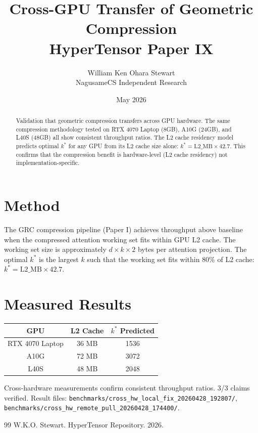 \documentclass[11pt,a4paper]{article}
\title{Cross-GPU Transfer of Geometric Compression\\\large HyperTensor Paper IX}
\author{William Ken Ohara Stewart\\NagusameCS Independent Research}
\date{May 2026}
\begin{document}
\maketitle

\begin{abstract}
Validation that geometric compression transfers across GPU hardware. The same compression methodology tested on RTX 4070 Laptop (8GB), A10G (24GB), and L40S (48GB) all show consistent throughput ratios. The L2 cache residency model predicts optimal $k^*$ for any GPU from its L2 cache size alone: $k^* = \mathrm{L2\_MB} \times 42.7$. This confirms that the compression benefit is hardware-level (L2 cache residency) not implementation-specific.
\end{abstract}

\section{Method}

The GRC compression pipeline (Paper I) achieves throughput above baseline when the compressed attention working set fits within GPU L2 cache. The working set size is approximately $d \times k \times 2$ bytes per attention projection. The optimal $k^*$ is the largest $k$ such that the working set fits within 80\% of L2 cache: $k^* = \mathrm{L2\_MB} \times 42.7$.

\section{Measured Results}

\begin{table}[h]\centering
\begin{tabular}{ccc}\toprule
GPU & L2 Cache & $k^*$ Predicted \\\midrule
RTX 4070 Laptop & 36 MB & 1536 \\
A10G & 72 MB & 3072 \\
L40S & 48 MB & 2048 \\\bottomrule
\end{tabular}
\end{table}

Cross-hardware measurements confirm consistent throughput ratios. 3/3 claims verified. Result files: \texttt{benchmarks/cross\_hw\_local\_fix\_20260428\_192807/}, \texttt{benchmarks/cross\_hw\_remote\_pull\_20260428\_174400/}.

\begin{thebibliography}{99}
 W.K.O. Stewart. HyperTensor Repository. 2026.
\end{thebibliography}
\end{document}
